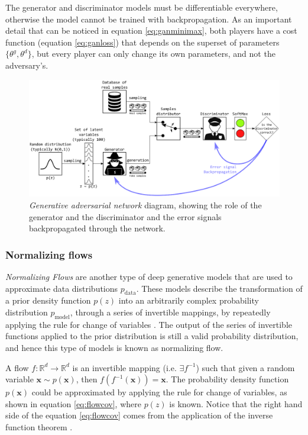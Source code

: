The generator and discriminator models must be differentiable everywhere, otherwise the model cannot be trained with backpropagation. As an important detail that can be noticed in equation \ref{eq:ganminimax}, both players have a cost function (equation \ref{eq:ganloss}) that depends on the superset  of parameters $\{\theta^g, \theta^d\}$, but every player can only change its own parameters, and not the adversary's.

\begin{figure}[h!]
	\centering
	\includegraphics[width=1\textwidth]{background/images/police_counterfeiter.eps}
	\caption[Generative adversarial network]{\textit{Generative adversarial network} diagram, showing the role of the generator and the discriminator and the error signals backpropagated through the network.}
	\label{fig:police_counterfeiter}
\end{figure}

\subsubsection{Normalizing flows} \label{sec:flows}
\textit{Normalizing Flows} are another type of deep generative models that are used to approximate data distributions $p_\mathrm{data}$. These models describe the transformation of a prior density function $p(z)$ into an arbitrarily complex probability distribution $p_\mathrm{model}$, through a series of invertible mappings, by repeatedly applying the rule for change of variables \autocite{rezende2015}. The output of the series of invertible functions applied to the prior distribution is still a valid probability distribution, and hence this type of models is known as normalizing flow.

A flow $f: \mathbb{R}^d \rightarrow \mathbb{R}^d$ is an invertible mapping (i.e. $\exists f^{-1}$) such that given a random variable $\mathbf{x} \sim p(\mathbf{x})$, then $f(f^{-1}(\mathbf{x})) = \mathbf{x}$. The probability density function $p(\mathbf{x})$ could be approximated by applying the rule for change of variables, as shown in equation \ref{eq:flowcov}, where $p(z)$ is known. Notice that the right hand side of the  equation \ref{eq:flowcov} comes from the application of the inverse function theorem \autocite{rezende2015}.

